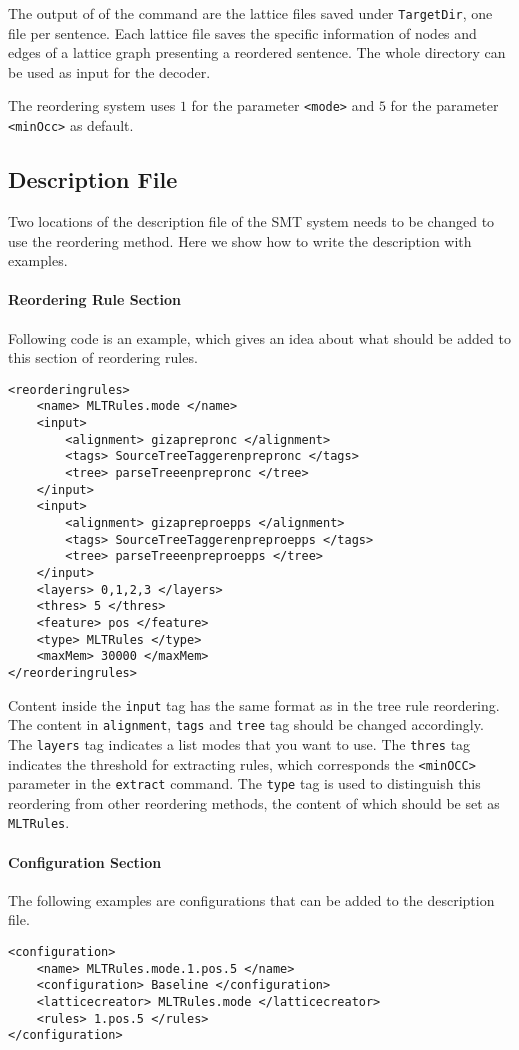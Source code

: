 The output of of the command are the lattice files saved under \verb|TargetDir|, one file per sentence. Each lattice file saves the specific information of nodes and edges of a lattice graph presenting a reordered sentence. The whole directory can be used as input for the decoder.

The reordering system uses $1$ for the parameter \verb|<mode>| and $5$ for the parameter \verb|<minOcc>| as default.

\subsection{Description File}

Two locations of the description file of the SMT system needs to be changed to use the reordering method. Here we show how to write the description with examples.

\paragraph{Reordering Rule Section}
Following code is an example, which gives an idea about what should be added to this section of reordering rules.

\begin{Verbatim}[frame=single]
<reorderingrules>
    <name> MLTRules.mode </name>
    <input>
        <alignment> gizaprepronc </alignment>
        <tags> SourceTreeTaggerenprepronc </tags>
        <tree> parseTreeenprepronc </tree>
    </input>
    <input>
        <alignment> gizapreproepps </alignment>
        <tags> SourceTreeTaggerenpreproepps </tags>
        <tree> parseTreeenpreproepps </tree>
    </input>
    <layers> 0,1,2,3 </layers>
    <thres> 5 </thres>
    <feature> pos </feature>
    <type> MLTRules </type>
    <maxMem> 30000 </maxMem>
</reorderingrules>
\end{Verbatim}
Content inside the \verb|input| tag has the same format as in the tree rule reordering. The content in \verb|alignment|, \verb|tags| and \verb|tree| tag should be changed accordingly. The \verb|layers| tag indicates a list modes that you want to use. The \verb|thres| tag indicates the threshold for extracting rules, which corresponds the \verb|<minOCC>| parameter in the \verb|extract| command. The \verb|type| tag is used to distinguish this reordering from other reordering methods, the content of which should be set as \verb|MLTRules|.

\paragraph{Configuration Section}
The following examples are configurations that can be added to the description file.
\begin{Verbatim}[frame=single]
<configuration>
    <name> MLTRules.mode.1.pos.5 </name>
    <configuration> Baseline </configuration>
    <latticecreator> MLTRules.mode </latticecreator>
    <rules> 1.pos.5 </rules>
</configuration>
\end{Verbatim}

